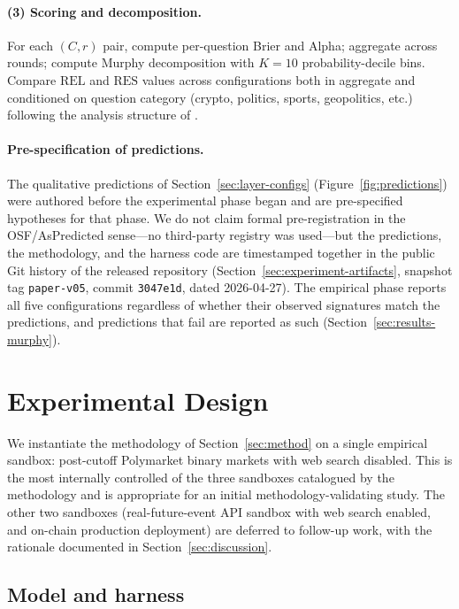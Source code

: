 \documentclass[11pt]{article}
\newcommand{\REL}{\mathrm{REL}}
\newcommand{\RES}{\mathrm{RES}}
\begin{document}
\paragraph{(3) Scoring and decomposition.}
For each $(C, r)$ pair, compute per-question Brier and Alpha; aggregate across rounds; compute Murphy decomposition with $K = 10$ probability-decile bins. Compare $\REL$ and $\RES$ values across configurations both in aggregate and conditioned on question category (crypto, politics, sports, geopolitics, etc.) following the analysis structure of \citet{nechepurenko2026foresight}.

\paragraph{Pre-specification of predictions.}
The qualitative predictions of Section~\ref{sec:layer-configs} (Figure~\ref{fig:predictions}) were authored before the experimental phase began and are pre-specified hypotheses for that phase. We do not claim formal pre-registration in the OSF/AsPredicted sense---no third-party registry was used---but the predictions, the methodology, and the harness code are timestamped together in the public Git history of the released repository (Section~\ref{sec:experiment-artifacts}, snapshot tag \texttt{paper-v05}, commit \texttt{3047e1d}, dated 2026-04-27). The empirical phase reports all five configurations regardless of whether their observed signatures match the predictions, and predictions that fail are reported as such (Section~\ref{sec:results-murphy}).

\section{Experimental Design}
\label{sec:experiment}

We instantiate the methodology of Section~\ref{sec:method} on a single empirical sandbox: post-cutoff Polymarket binary markets with web search disabled. This is the most internally controlled of the three sandboxes catalogued by the methodology and is appropriate for an initial methodology-validating study. The other two sandboxes (real-future-event API sandbox with web search enabled, and on-chain production deployment) are deferred to follow-up work, with the rationale documented in Section~\ref{sec:discussion}.

\subsection{Model and harness}
\label{sec:experiment-model}
\end{document}
